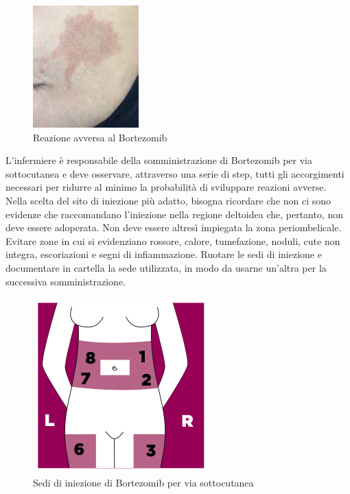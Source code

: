 \begin{figure}[H]
    \begin{center}
    \includegraphics[width=0.3\columnwidth]{img/bortezomibreaction2.jpeg}
    \vspace{-3mm}
    \end{center}
    \caption{ Reazione avversa al Bortezomib
    \cite{BORTNURSES}}
   
\end{figure}

L’infermiere è responsabile della somministrazione di Bortezomib per via sottocutanea e deve osservare,
attraverso una serie di step, tutti gli accorgimenti necessari per ridurre al minimo la probabilità di sviluppare 
reazioni avverse.\\ 
Nella scelta del sito di iniezione più adatto, bisogna ricordare che non ci sono evidenze che raccomandano l’iniezione 
nella regione deltoidea che, pertanto, non deve essere adoperata. Non deve essere altresì impiegata la zona periombelicale.
Evitare zone in cui si evidenziano rossore, calore, 
tumefazione, noduli, cute non integra, escoriazioni e segni di infiammazione. 
Ruotare le sedi di iniezione e documentare in cartella la sede utilizzata, in modo da usarne 
un’altra per la successiva somministrazione\cite{BORTNURSES}.

\begin{figure}[H]
    \begin{center}
    \includegraphics[width=0.3\columnwidth]{img/SEDI.png}
    \vspace{-3mm}
    \end{center}
    \caption{ Sedi di iniezione di Bortezomib per via sottocutanea
    \cite{BORTEZOMIB}}

\end{figure}

